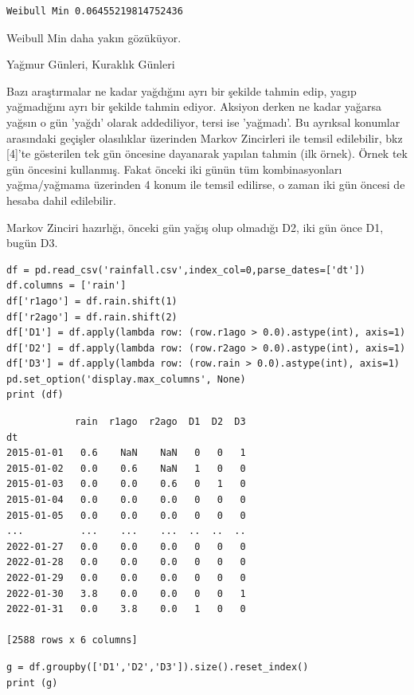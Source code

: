 \documentclass[12pt,fleqn]{article}\usepackage{../../common}
\begin{document}
\begin{verbatim}
Weibull Min 0.06455219814752436
\end{verbatim}

Weibull Min daha yakın gözüküyor.

Yağmur Günleri, Kuraklık Günleri

Bazı araştırmalar ne kadar yağdığını ayrı bir şekilde tahmin edip, yagıp
yağmadığını ayrı bir şekilde tahmin ediyor. Aksiyon derken ne kadar yağarsa
yağsın o gün 'yağdı' olarak addediliyor, tersi ise 'yağmadı'. Bu ayrıksal
konumlar arasındaki geçişler olasılıklar üzerinden Markov Zincirleri ile temsil
edilebilir, bkz [4]'te gösterilen tek gün öncesine dayanarak yapılan tahmin (ilk
örnek). Örnek tek gün öncesini kullanmış. Fakat önceki iki günün tüm
kombinasyonları yağma/yağmama üzerinden 4 konum ile temsil edilirse, o zaman iki
gün öncesi de hesaba dahil edilebilir.

Markov Zinciri hazırlığı, önceki gün yağış olup olmadığı D2, iki gün önce D1,
bugün D3.

\begin{verbatim}
df = pd.read_csv('rainfall.csv',index_col=0,parse_dates=['dt'])
df.columns = ['rain']
df['r1ago'] = df.rain.shift(1)
df['r2ago'] = df.rain.shift(2)
df['D1'] = df.apply(lambda row: (row.r1ago > 0.0).astype(int), axis=1)
df['D2'] = df.apply(lambda row: (row.r2ago > 0.0).astype(int), axis=1)
df['D3'] = df.apply(lambda row: (row.rain > 0.0).astype(int), axis=1)
pd.set_option('display.max_columns', None)
print (df)
\end{verbatim}

\begin{verbatim}
            rain  r1ago  r2ago  D1  D2  D3
dt                                        
2015-01-01   0.6    NaN    NaN   0   0   1
2015-01-02   0.0    0.6    NaN   1   0   0
2015-01-03   0.0    0.0    0.6   0   1   0
2015-01-04   0.0    0.0    0.0   0   0   0
2015-01-05   0.0    0.0    0.0   0   0   0
...          ...    ...    ...  ..  ..  ..
2022-01-27   0.0    0.0    0.0   0   0   0
2022-01-28   0.0    0.0    0.0   0   0   0
2022-01-29   0.0    0.0    0.0   0   0   0
2022-01-30   3.8    0.0    0.0   0   0   1
2022-01-31   0.0    3.8    0.0   1   0   0

[2588 rows x 6 columns]
\end{verbatim}

\begin{verbatim}
g = df.groupby(['D1','D2','D3']).size().reset_index()
print (g)
\end{verbatim}
\end{document}
